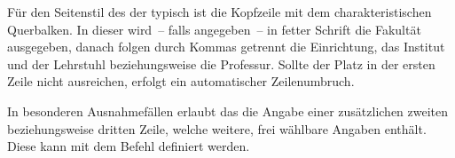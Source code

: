 \begin{Declaration}{}
\begin{Declaration}{}
\begin{Declaration}{}
\begin{Declaration}{}
\begin{Declaration}{}
\printdeclarationlist%
%
%
%
Für den Seitenstil des \CDs der \TnUD typisch ist die Kopfzeile mit dem 
charakteristischen Querbalken. In dieser wird~-- falls angegeben~-- in fetter 
Schrift die Fakultät ausgegeben, danach folgen durch Kommas getrennt die 
Einrichtung, das Institut und der Lehrstuhl beziehungsweise die Professur. 
Sollte der Platz in der ersten Zeile nicht ausreichen, erfolgt ein 
automatischer Zeilenumbruch.

In besonderen Ausnahmefällen erlaubt das \CD die Angabe einer zusätzlichen
zweiten beziehungsweise dritten Zeile, welche weitere, frei wählbare Angaben 
enthält. Diese kann mit dem Befehl  
definiert werden.
\end{Declaration}
\end{Declaration}
\end{Declaration}
\end{Declaration}
\end{Declaration}

